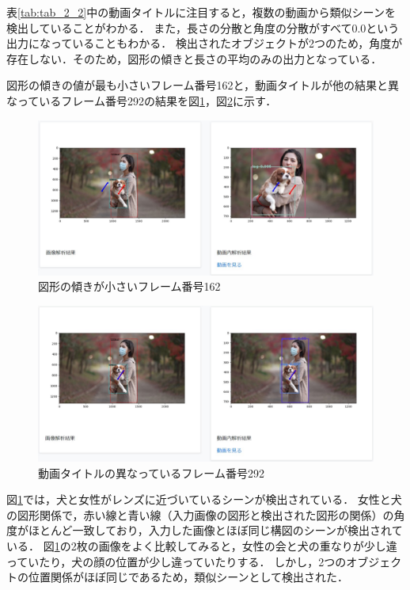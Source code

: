 \documentclass[a4j,12pt,dvipdfmx]{jreport}
\begin{document}
表\ref{tab:tab_2_2}中の動画タイトルに注目すると，複数の動画から類似シーンを検出していることがわかる．
また，長さの分散と角度の分散がすべて0.0という出力になっていることもわかる．
検出されたオブジェクトが2つのため，角度が存在しない．そのため，図形の傾きと長さの平均のみの出力となっている．

図形の傾きの値が最も小さいフレーム番号162と，動画タイトルが他の結果と異なっているフレーム番号292の結果を図\ref{fig:img_2_2_3}，図\ref{fig:img_2_2_4}に示す．
\begin{figure}[t]
  \centering
  \includegraphics[width=13cm]{image/result2_2_3.jpg}
  \caption{図形の傾きが小さいフレーム番号162}
  \label{fig:img_2_2_3}
\end{figure}

\begin{figure}[t]
  \centering
  \includegraphics[width=13cm]{image/result2_2_4.jpg}
  \caption{動画タイトルの異なっているフレーム番号292}
  \label{fig:img_2_2_4}
\end{figure}

図\ref{fig:img_2_2_3}では，犬と女性がレンズに近づいているシーンが検出されている．
女性と犬の図形関係で，赤い線と青い線（入力画像の図形と検出された図形の関係）の角度がほとんど一致しており，入力した画像とほぼ同じ構図のシーンが検出されている．
図\ref{fig:img_2_2_3}の2枚の画像をよく比較してみると，女性の会と犬の重なりが少し違っていたり，犬の顔の位置が少し違っていたりする．
しかし，2つのオブジェクトの位置関係がほぼ同じであるため，類似シーンとして検出された．
\end{document}
